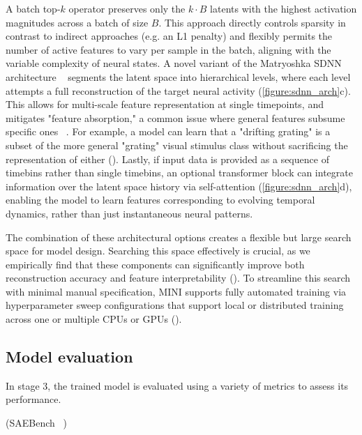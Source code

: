 A batch top-$k$ operator preserves only the $k \cdot B$ latents with the highest activation magnitudes across a batch of size $B$. This approach directly controls sparsity in contrast to indirect approaches (e.g. an L1 penalty) and flexibly permits the number of active features to vary per sample in the batch, aligning with the variable complexity of neural states. A novel variant of the Matryoshka SDNN architecture ~\cite{bussmann_2025_msae} segments the latent space into hierarchical levels, where each level attempts a full reconstruction of the target neural activity (\autoref{figure:sdnn_arch}c). This allows for multi-scale feature representation at single timepoints, and mitigates "feature absorption," a common issue where general features subsume specific ones ~\cite{chanin_2024_feature_absorption}. For example, a model can learn that a "drifting grating" is a subset of the more general "grating" visual stimulus class without sacrificing the representation of either (). Lastly, if input data is provided as a sequence of timebins rather than single timebins, an optional transformer block can integrate information over the latent space history via self-attention (\autoref{figure:sdnn_arch}d), enabling the model to learn features corresponding to evolving temporal dynamics, rather than just instantaneous neural patterns. 

The combination of these architectural options creates a flexible but large search space for model design. Searching this space effectively is crucial, as we empirically find that these components can significantly improve both reconstruction accuracy and feature interpretability (). To streamline this search with minimal manual specification, MINI supports fully automated training via hyperparameter sweep configurations that support local or distributed training across one or multiple CPUs or GPUs ().

\subsection{Model evaluation}

In stage 3, the trained model is evaluated using a variety of metrics to assess its performance. 

(SAEBench ~\cite{karvonen_2025_saebench})

